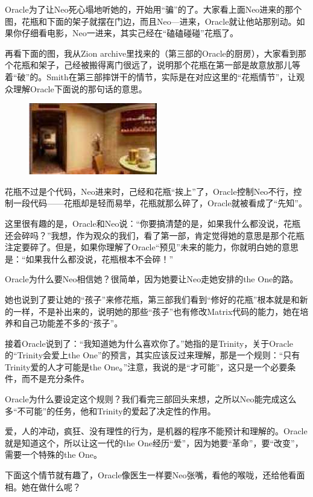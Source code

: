 \documentclass{ctexart}
\begin{document}
Oracle为了让Neo死心塌地听她的，开始用“骗”的了。大家看上面Neo进来的那个图，花瓶和下面的架子就摆在门边，而且Neo—进来，Oracle就让他站那别动。如果你仔细看电影，Neo一进来，其实己经在“磕磕碰碰”花瓶了。

再看下面的图，我从Zion archive里找来的（第三部的Oracle的厨房），大家看到那个花瓶和架子，己经被搬得离门很远了，说明那个花瓶在第一部是故意放那儿等着“破”的。Smith在第三部摔饼干的情节，实际是在对应这里的“花瓶情节”，让观众理解Oracle下面说的那句话的意思。

\begin{figure}[htb]
\centering
\includegraphics[width=0.5\linewidth]{fig/read_Matrix-48}
\end{figure}

花瓶不过是个代码，Neo进来时，己经和花瓶“挨上”了，Oracle控制Neo不行，控制一段代码——花瓶却是轻而易举，花瓶就那么碎了，Oracle就被看成了“先知”。

这里很有趣的是，Oracle和Neo说：“你要搞清楚的是，如果我什么都没说，花瓶还会碎吗？”我想，作为观众的我们，看了第一部，肯定觉得她的意思是那个花瓶注定要碎了。但是，如果你理解了Oracle“预见”未来的能力，你就明白她的意思是：“如果我什么都没说，花瓶根本不会碎！”

Oracle为什么要Neo相信她？很简单，因为她要让Neo走她安排的the One的路。

她也说到了要让她的“孩子”来修花瓶，第三部我们看到“修好的花瓶”根本就是和新的一样，不是补出来的，说明她的那些“孩子”也有修改Matrix代码的能力，她在培养和自己功能差不多的“孩子”。

接着Oracle说到了：“我知道她为什么喜欢你了。”她指的是Trinity，关于Oracle的“Trinity会爱上the One”的预言，其实应该反过来理解，那是一个规则：“只有Trinity爱的人才可能是the One。”注意，我说的是“才可能”，这只是一个必要条件，而不是充分条件。

Oracle为什么要设定这个规则？我们看完三部回头来想，之所以Neo能完成这么多“不可能”的任务，他和Trinity的爱起了决定性的作用。

爱，人的冲动，疯狂、没有理性的行为，是机器的程序不能预计和理解的。Oracle就是知道这个，所以让这一代的the One经历“爱”，因为她要“革命”，要“改变”，需要一个特殊的the One。

下面这个情节就有趣了，Oracle像医生一样要Neo张嘴，看他的喉咙，还给他看面相。她在做什么呢？
\end{document}
